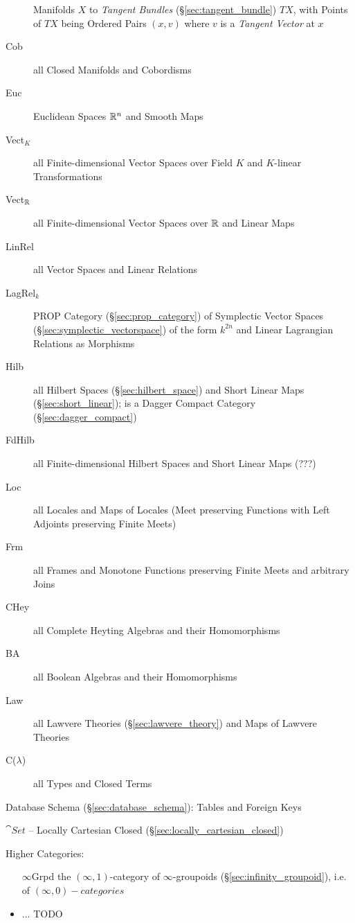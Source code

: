 \begin{description}
  Manifolds $X$ to \emph{Tangent Bundles} (\S\ref{sec:tangent_bundle}) $T X$,
  with Points of $T X$ being Ordered Pairs $(x, v)$ where $v$ is a \emph{Tangent
    Vector} at $x$
\item [Cob] all Closed Manifolds and Cobordisms
\item [Euc] Euclidean Spaces $\mathbb{R}^n$ and Smooth Maps
\item [Vect$_K$] all Finite-dimensional Vector Spaces over Field $K$
  and $K$-linear Transformations
\item [Vect$_{\mathbb{R}}$] all Finite-dimensional Vector Spaces over
  $\mathbb{R}$ and Linear Maps
\item [LinRel] all Vector Spaces and Linear Relations %
\item [LagRel$_k$] PROP Category (\S\ref{sec:prop_category}) of Symplectic
  Vector Spaces (\S\ref{sec:symplectic_vectorspace}) of the form $k^{2n}$ and
  Linear Lagrangian Relations as Morphisms
\item [Hilb] all Hilbert Spaces (\S\ref{sec:hilbert_space}) and Short
  Linear Maps (\S\ref{sec:short_linear}); is a Dagger Compact Category
  (\S\ref{sec:dagger_compact})
\item [FdHilb] all Finite-dimensional Hilbert Spaces and Short Linear
  Maps (???)
\item [Loc] all Locales and Maps of Locales (Meet preserving Functions
  with Left Adjoints preserving Finite Meets)
\item [Frm] all Frames and Monotone Functions preserving Finite Meets
  and arbitrary Joins
\item [CHey] all Complete Heyting Algebras and their Homomorphisms
\item [BA] all Boolean Algebras and their Homomorphisms
\item [Law] all Lawvere Theories (\S\ref{sec:lawvere_theory}) and Maps
  of Lawvere Theories
\item [C($\lambda$)] all Types and Closed Terms
\end{description}

Database Schema (\S\ref{sec:database_schema}): Tables and Foreign Keys

$\cat{Set}$ -- Locally Cartesian Closed
(\S\ref{sec:locally_cartesian_closed})

Higher Categories:


\begin{itemize}
\item [$\infty$Grpd] the $(\infty,1)$-category of $\infty$-groupoids
  (\S\ref{sec:infinity_groupoid}), i.e. of $(\infty,0)-categories$
\item ... TODO
\end{itemize}



